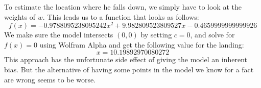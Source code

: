 To estimate the location where he falls down, we simply have to look at the weights of $w$. This leads us to a function that looks as follows:
$$
f(x) =-0.9788095238095242x^2 + 9.982809523809527x -0.4659999999999926
$$
We make sure the model intersects $(0,0)$ by setting $c = 0$, and solve for $f(x) = 0$ using Wolfram Alpha and get the following value for the landing: 
$$
x = 10.19892970080272
$$
This approach has the unfortunate side effect of giving the model an inherent bias. But the alternative of having some points in the model we know for a fact are wrong seems to be worse.